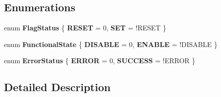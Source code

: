 \subsection*{Enumerations}
\begin{DoxyCompactItemize}
\item 
enum {\bfseries Flag\-Status} \{ {\bfseries R\-E\-S\-E\-T} = 0, 
{\bfseries S\-E\-T} = !\-R\-E\-S\-E\-T
 \}
\item 
enum {\bfseries Functional\-State} \{ {\bfseries D\-I\-S\-A\-B\-L\-E} = 0, 
{\bfseries E\-N\-A\-B\-L\-E} = !\-D\-I\-S\-A\-B\-L\-E
 \}
\item 
enum {\bfseries Error\-Status} \{ {\bfseries E\-R\-R\-O\-R} = 0, 
{\bfseries S\-U\-C\-C\-E\-S\-S} = !\-E\-R\-R\-O\-R
 \}
\end{DoxyCompactItemize}


\subsection{Detailed Description}


